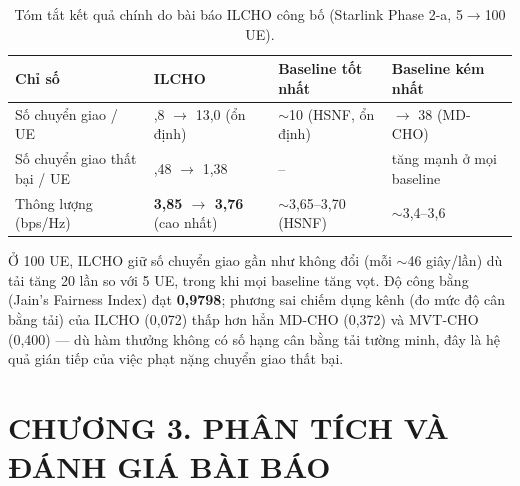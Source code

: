 \documentclass{article} %
\begin{document}
\begin{table}[h!]
\centering
\caption{Tóm tắt kết quả chính do bài báo ILCHO công bố (Starlink Phase 2-a, 5$\to$100 UE).}
\label{tab:results-paper}
\begin{tabular}{|>{\raggedright\arraybackslash}p{3.4cm}|>{\raggedright\arraybackslash}p{3.6cm}|>{\raggedright\arraybackslash}p{3cm}|>{\raggedright\arraybackslash}p{3cm}|}
\hline
\textbf{Chỉ số} & \textbf{ILCHO} & \textbf{Baseline tốt nhất} & \textbf{Baseline kém nhất} \\
\hline
Số chuyển giao / UE & 10,8 $\to$ 13,0 (ổn định) & $\sim$10 (HSNF, ổn định) & 10 $\to$ 38 (MD-CHO) \\
\hline
Số chuyển giao thất bại / UE & 0,48 $\to$ 1,38 & -- & tăng mạnh ở mọi baseline \\
\hline
Thông lượng (bps/Hz) & \textbf{3,85 $\to$ 3,76} (cao nhất) & $\sim$3,65--3,70 (HSNF) & $\sim$3,4--3,6 \\
\hline
\end{tabular}
\end{table}

Ở 100 UE, ILCHO giữ số chuyển giao gần như không đổi (mỗi $\sim$46 giây/lần) dù tải tăng 20 lần so với 5 UE, trong khi mọi baseline tăng vọt. Độ công bằng (Jain's Fairness Index) đạt \textbf{0,9798}; phương sai chiếm dụng kênh (đo mức độ cân bằng tải) của ILCHO (0,072) thấp hơn hẳn MD-CHO (0,372) và MVT-CHO (0,400) — dù hàm thưởng không có số hạng cân bằng tải tường minh, đây là hệ quả gián tiếp của việc phạt nặng chuyển giao thất bại.

\newpage
\section*{CHƯƠNG 3. PHÂN TÍCH VÀ ĐÁNH GIÁ BÀI BÁO}
\setcounter{section}{3}
\setcounter{subsection}{0}
\setcounter{figure}{0}
\setcounter{table}{0}
\end{document}
